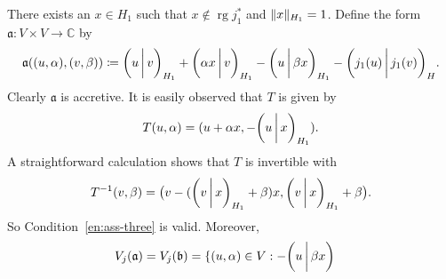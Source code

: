 \documentclass[a4paper,oneside,12pt]{amsart}
\theoremstyle{plain}
\theoremstyle{definition}
\newenvironment{example}
{\pushQED{\qed}

\examplex}
{\popQED\endexamplex}
\DeclarePairedDelimiter\norm{\lVert}{\rVert}
\begin{document}
\begin{example}
There exists an $x\in H_1$ such that $x\notin\operatorname{rg} j_1^*$ and $\norm{x}_{H_1}=1$. Define the form ${{\mathfrak{{a}}}}\colon V\times V\to{\mathbb{C}}$ by
\[
    {{\mathfrak{{a}}}}((u,\alpha),(v,\beta)) \coloneqq{{\ifthenelse{\equal{auto}{auto}}{\left({u}\mkern3mu{\biggm|}\mkern3mu {v}\right)}{}
\ifthenelse{\equal{auto}{b}}{\bigl({u}\mkern3mu{\biggm|}\mkern3mu {v}\bigr)}{}
\ifthenelse{\equal{auto}{B}}{\Bigl({u}\mkern3mu{\bigm|}\mkern3mu {v}\Bigr)}{}
}}_{H_1}+{{\ifthenelse{\equal{auto}{auto}}{\left({\alpha x}\mkern3mu{\biggm|}\mkern3mu {v}\right)}{}
\ifthenelse{\equal{auto}{b}}{\bigl({\alpha x}\mkern3mu{\biggm|}\mkern3mu {v}\bigr)}{}
\ifthenelse{\equal{auto}{B}}{\Bigl({\alpha x}\mkern3mu{\bigm|}\mkern3mu {v}\Bigr)}{}
}}_{H_1}-{{\ifthenelse{\equal{auto}{auto}}{\left({u}\mkern3mu{\biggm|}\mkern3mu {\beta x}\right)}{}
\ifthenelse{\equal{auto}{b}}{\bigl({u}\mkern3mu{\biggm|}\mkern3mu {\beta x}\bigr)}{}
\ifthenelse{\equal{auto}{B}}{\Bigl({u}\mkern3mu{\bigm|}\mkern3mu {\beta x}\Bigr)}{}
}}_{H_1}-{{\ifthenelse{\equal{auto}{auto}}{\left({j_1(u)}\mkern3mu{\biggm|}\mkern3mu {j_1(v)}\right)}{}
\ifthenelse{\equal{auto}{b}}{\bigl({j_1(u)}\mkern3mu{\biggm|}\mkern3mu {j_1(v)}\bigr)}{}
\ifthenelse{\equal{auto}{B}}{\Bigl({j_1(u)}\mkern3mu{\bigm|}\mkern3mu {j_1(v)}\Bigr)}{}
}}_H.
\]
Clearly ${{\mathfrak{{a}}}}$ is accretive.
It is easily observed that $T$ is given 
by 
\[
    T(u,\alpha)=(u+\alpha x, -{{\ifthenelse{\equal{auto}{auto}}{\left({u}\mkern3mu{\biggm|}\mkern3mu {x}\right)}{}
\ifthenelse{\equal{auto}{b}}{\bigl({u}\mkern3mu{\biggm|}\mkern3mu {x}\bigr)}{}
\ifthenelse{\equal{auto}{B}}{\Bigl({u}\mkern3mu{\bigm|}\mkern3mu {x}\Bigr)}{}
}}_{H_1}).
\]
A straightforward calculation shows that $T$ is invertible with
\[
    T^{-1}(v,\beta)=\bigl( v-({{\ifthenelse{\equal{auto}{auto}}{\left({v}\mkern3mu{\biggm|}\mkern3mu {x}\right)}{}
\ifthenelse{\equal{auto}{b}}{\bigl({v}\mkern3mu{\biggm|}\mkern3mu {x}\bigr)}{}
\ifthenelse{\equal{auto}{B}}{\Bigl({v}\mkern3mu{\bigm|}\mkern3mu {x}\Bigr)}{}
}}_{H_1}+\beta)x, {{\ifthenelse{\equal{auto}{auto}}{\left({v}\mkern3mu{\biggm|}\mkern3mu {x}\right)}{}
\ifthenelse{\equal{auto}{b}}{\bigl({v}\mkern3mu{\biggm|}\mkern3mu {x}\bigr)}{}
\ifthenelse{\equal{auto}{B}}{\Bigl({v}\mkern3mu{\bigm|}\mkern3mu {x}\Bigr)}{}
}}_{H_1}+\beta\bigr).
\]
So Condition~\ref{en:ass-three} is valid.
Moreover,
\begin{align*}
    V_j({{\mathfrak{{a}}}}) = V_j({{\mathfrak{{b}}}}) &=\{(u,\alpha)\in V: -{{\ifthenelse{\equal{auto}{auto}}{\left({u}\mkern3mu{\biggm|}\mkern3mu {\beta x}\right)}{}
\ifthenelse{\equal{auto}{b}}{\bigl({u}\mkern3mu{\biggm|}\mkern3mu {\beta x}\bigr)}{}
}}
\end{align*}
\end{example}
\end{document}
